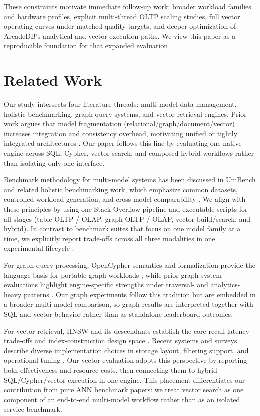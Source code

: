 \documentclass[sigconf, nonacm]{acmart}
\begin{document}
These constraints motivate immediate follow-up work: broader workload families and hardware profiles, explicit multi-thread OLTP scaling studies, full vector operating curves under matched quality targets, and deeper optimization of ArcadeDB's analytical and vector execution paths. We view this paper as a reproducible foundation for that expanded evaluation \cite{Zhang_2019_Unibench,Kim_2022,Zhang_2019_Holistic}.

\section{Related Work}

Our study intersects four literature threads: multi-model data management, holistic benchmarking, graph query systems, and vector retrieval engines. Prior work argues that model fragmentation (relational/graph/document/vector) increases integration and consistency overhead, motivating unified or tightly integrated architectures \cite{Lu_2019,Ye_2023,Guo_2023,Lei_2024}. Our paper follows this line by evaluating one native engine across SQL, Cypher, vector search, and composed hybrid workflows rather than isolating only one interface.

Benchmark methodology for multi-model systems has been discussed in UniBench and related holistic benchmarking work, which emphasize common datasets, controlled workload generation, and cross-model comparability \cite{Zhang_2019_Unibench,Zhang_2019_Holistic}. We align with these principles by using one Stack Overflow pipeline and executable scripts for all stages (table OLTP / OLAP, graph OLTP / OLAP, vector build/search, and hybrid). In contrast to benchmark suites that focus on one model family at a time, we explicitly report trade-offs across all three modalities in one experimental lifecycle \cite{Kim_2022}.

For graph query processing, OpenCypher semantics and formalization provide the language basis for portable graph workloads \cite{opencypher_spec,marton2017formalising}, while prior graph system evaluations highlight engine-specific strengths under traversal- and analytics-heavy patterns \cite{Erling_2015,Puroja_2024,Qi_2025}. Our graph experiments follow this tradition but are embedded in a broader multi-model comparison, so graph results are interpreted together with SQL and vector behavior rather than as standalone leaderboard outcomes.

For vector retrieval, HNSW and its descendants establish the core recall-latency trade-offs and index-construction design space \cite{malkov2016efficient,chen2021spann,singh2021freshdiskann}. Recent systems and surveys describe diverse implementation choices in storage layout, filtering support, and operational tuning \cite{Pan_2024_vldbj,Upreti_2025,Sun_2025,Hu_2025}. Our vector evaluation adopts this perspective by reporting both effectiveness and resource costs, then connecting them to hybrid SQL/Cypher/vector execution in one engine. This placement differentiates our contribution from pure ANN benchmark papers: we treat vector search as one component of an end-to-end multi-model workflow rather than as an isolated service benchmark.
\end{document}
